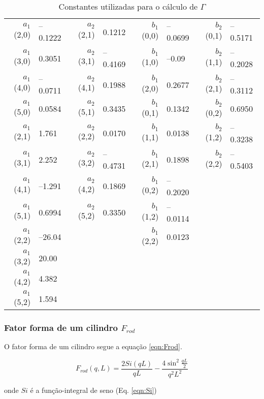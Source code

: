 \begin{apendicesenv}
    \begin{table}[h]
        \IBGEtab%
        {\caption{Constantes utilizadas para o cálculo de $\Gamma$}
        \label{tab_ap:AiBi}}%
        {\begin{tabular}{r l | r l | r l | r l}
        \toprule
        $a_1$(2,0) & --0.1222 & $a_2$(2,1) & 0.1212 & $b_1$(0,0) &
        --0.0699 & $b_2$(0,1) & --0.5171\\
        $a_1$(3,0) & 0.3051 & $a_2$(3,1) & --0.4169 & $b_1$(1,0) & --0.09
        & $b_2$(1,1) & --0.2028\\
        $a_1$(4,0) & --0.0711 & $a_2$(4,1) & 0.1988 & $b_1$(2,0) &
        0.2677 & $b_2$(2,1) & --0.3112\\
        $a_1$(5,0) & 0.0584 & $a_2$(5,1) & 0.3435 & $b_1$(0,1) & 0.1342
        & $b_2$(0,2) & 0.6950\\
        $a_1$(2,1) & 1.761 & $a_2$(2,2) & 0.0170 & $b_1$(1,1) & 0.0138 &
        $b_2$(1,2) & --0.3238\\
        $a_1$(3,1) & 2.252 & $a_2$(3,2) & --0.4731 & $b_1$(2,1) & 0.1898
        & $b_2$(2,2) & --0.5403\\
        $a_1$(4,1) & --1.291 & $a_2$(4,2) & 0.1869 & $b_1$(0,2) & --0.2020
        & &\\
        $a_1$(5,1) & 0.6994 & $a_2$(5,2) & 0.3350 & $b_1$(1,2) & --0.0114
        & &\\
        $a_1$(2,2) & --26.04 & & & $b_1$(2,2) & 0.0123 & &\\
        $a_1$(3,2) & 20.00 & & & & & &\\
        $a_1$(4,2) & 4.382 & & & & & &\\
        $a_1$(5,2) & 1.594 & & & & & &\\
        \bottomrule
       \end{tabular} }%
        {}%
    \end{table}
    
	\subsubsection{Fator forma de um cilindro $F_{rod}$}
	
	O fator forma de um cilindro segue a equação \ref{eqn:Frod}.
	
	\begin{equation}
	F_{rod}(q, L) = \frac{2Si(qL)}{qL} - \frac{4\sin^2\frac{qL}{2}}{q^2L^2}
	\label{eqn:Frod}
	\end{equation}
	
	\noindent onde $Si$ é a função-integral de seno (Eq. \ref{eqn:Si})
	

\end{apendicesenv}
